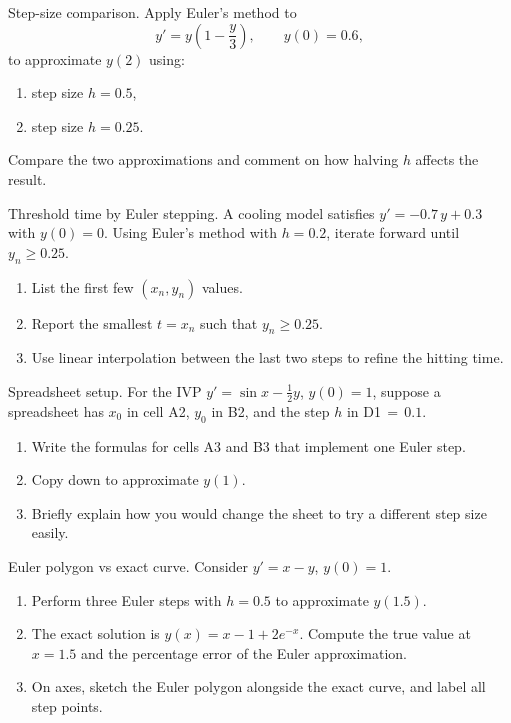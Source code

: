 \documentclass[11pt]{article}
\def\textbf#1{#1}%
\def\texttt#1{#1}%
\newcounter{question}
\begin{document}
\begin{question}
\textbf{Step-size comparison.}
Apply Euler’s method to
\[
y' = y\!\left(1-\frac{y}{3}\right),\qquad y(0)=0.6,
\]
to approximate $y(2)$ using:
\begin{enumerate}
  \item step size $h=0.5$,
  \item step size $h=0.25$.
\end{enumerate}
Compare the two approximations and comment on how halving $h$ affects the result.
\end{question}

\begin{question}
\textbf{Threshold time by Euler stepping.}
A cooling model satisfies $y'=-0.7\,y+0.3$ with $y(0)=0$.
Using Euler’s method with $h=0.2$, iterate forward until $y_n\ge 0.25$.
\begin{enumerate}
  \item List the first few $(x_n,y_n)$ values.
  \item Report the smallest $t=x_n$ such that $y_n\ge 0.25$.
  \item Use linear interpolation between the last two steps to refine the hitting time.
\end{enumerate}
\end{question}

\begin{question}
\textbf{Spreadsheet setup.}
For the IVP $y'= \sin x-\tfrac12 y$, $y(0)=1$, suppose a spreadsheet has
$x_0$ in cell \texttt{A2}, $y_0$ in \texttt{B2}, and the step $h$ in \texttt{D1}$\,{=}\,0.1$.
\begin{enumerate}
  \item Write the formulas for cells \texttt{A3} and \texttt{B3} that implement one Euler step.
  \item Copy down to approximate $y(1)$.
  \item Briefly explain how you would change the sheet to try a different step size easily.
\end{enumerate}
\end{question}

\begin{question}
\textbf{Euler polygon vs exact curve.}
Consider $y' = x-y$, $y(0)=1$.
\begin{enumerate}
  \item Perform three Euler steps with $h=0.5$ to approximate $y(1.5)$.
  \item The exact solution is $y(x)=x-1+2e^{-x}$. Compute the true value at $x=1.5$ and the percentage error of the Euler approximation.
  \item On axes, sketch the Euler polygon alongside the exact curve, and label all step points.
\end{enumerate}
\end{question}
\end{document}
